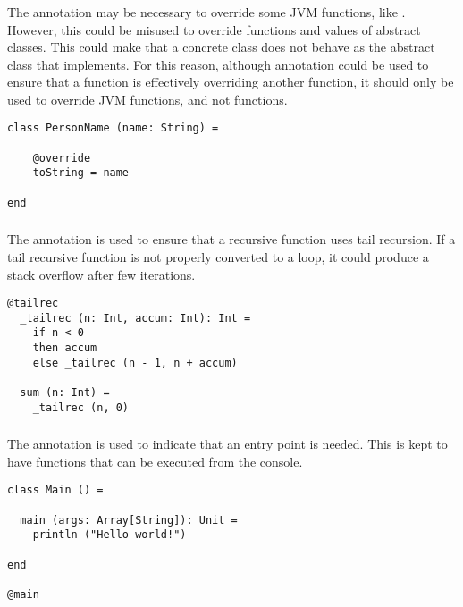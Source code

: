 \subsubsection{\sodaoverride}

The \sodaoverride annotation may be necessary to override some JVM functions, like .
However, this could be misused to override functions and values of abstract classes.
This could make that a concrete class does not behave as the abstract class that implements.
For this reason, although \sodaoverride annotation could be used to ensure that a function is effectively overriding another function, it should only be used to override JVM functions, and not \Soda functions.

\begin{lstlisting}[label={lst:exampleOverride}]
class PersonName (name: String) =

    @override
    toString = name

end
\end{lstlisting}

\subsubsection{\sodatailrec}

The \sodatailrec annotation is used to ensure that a recursive function uses tail recursion.
If a tail recursive function is not properly converted to a loop, it could produce a stack overflow after few iterations.

\begin{lstlisting}[label={lst:exampleTailrecInside}]
  @tailrec
  _tailrec (n: Int, accum: Int): Int =
    if n < 0
    then accum
    else _tailrec (n - 1, n + accum)

  sum (n: Int) =
    _tailrec (n, 0)
\end{lstlisting}

\subsubsection{\sodamain}

The \sodamain annotation is used to indicate that an entry point is needed.
This is kept to have functions that can be executed from the console.

\begin{lstlisting}[label={lst:exampleMain}]
class Main () =

  main (args: Array[String]): Unit =
    println ("Hello world!")

end

@main
\end{lstlisting}

